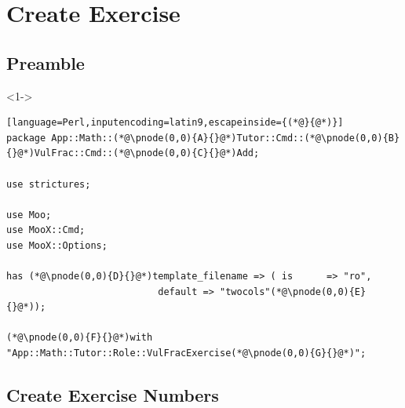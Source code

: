 \documentclass[ngerman,xcolor={table,dvipsnames},smaller,compress,hyperref={bookmarks,colorlinks}]{beamer}
\begin{document}
\section{Create Exercise}

\subsection{Preamble}

\begin{frame}[t,fragile]

\begin{block}<1->{}
\scriptsize
\begin{lstlisting}[language=Perl,inputencoding=latin9,escapeinside={(*@}{@*)}]
package App::Math::(*@\pnode(0,0){A}{}@*)Tutor::Cmd::(*@\pnode(0,0){B}{}@*)VulFrac::Cmd::(*@\pnode(0,0){C}{}@*)Add;

use strictures;

use Moo;
use MooX::Cmd;
use MooX::Options;

has (*@\pnode(0,0){D}{}@*)template_filename => ( is      => "ro",
                           default => "twocols"(*@\pnode(0,0){E}{}@*));

(*@\pnode(0,0){F}{}@*)with "App::Math::Tutor::Role::VulFracExercise(*@\pnode(0,0){G}{}@*)";
\end{lstlisting}
\end{block}

\begin{itemize}
\end{itemize}
\end{frame}

\subsection{Create Exercise Numbers}
\end{document}
